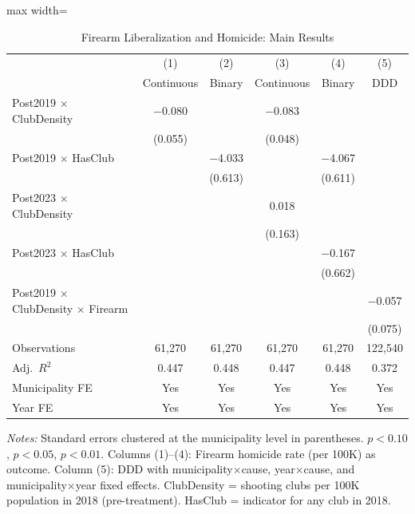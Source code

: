 \begin{table}[t]
\centering
\caption{Firearm Liberalization and Homicide: Main Results}
\label{tab:main_results}
\begin{adjustbox}{max width=\textwidth}
\begin{tabular}{lccccc}
\toprule
 & (1) & (2) & (3) & (4) & (5) \\
 & Continuous & Binary & Continuous & Binary & DDD \\
\midrule
Post2019 $\times$ ClubDensity & $-$0.080 & & $-$0.083\sym{*} & & \\
 & (0.055) & & (0.048) & & \\[3pt]
Post2019 $\times$ HasClub & & $-$4.033\sym{***} & & $-$4.067\sym{***} & \\
 & & (0.613) & & (0.611) & \\[3pt]
Post2023 $\times$ ClubDensity & & & 0.018 & & \\
 & & & (0.163) & & \\[3pt]
Post2023 $\times$ HasClub & & & & $-$0.167 & \\
 & & & & (0.662) & \\[3pt]
Post2019 $\times$ ClubDensity $\times$ Firearm & & & & & $-$0.057 \\
 & & & & & (0.075) \\
\midrule
Observations & 61,270 & 61,270 & 61,270 & 61,270 & 122,540 \\
Adj.\ $R^2$ & 0.447 & 0.448 & 0.447 & 0.448 & 0.372 \\
Municipality FE & Yes & Yes & Yes & Yes & Yes \\
Year FE & Yes & Yes & Yes & Yes & Yes \\
\bottomrule
\end{tabular}
\end{adjustbox}
\begin{flushleft}\small
\textit{Notes:} Standard errors clustered at the municipality level in parentheses. \sym{*} $p<0.10$, \sym{**} $p<0.05$, \sym{***} $p<0.01$. Columns (1)--(4): Firearm homicide rate (per 100K) as outcome. Column (5): DDD with municipality$\times$cause, year$\times$cause, and municipality$\times$year fixed effects. ClubDensity = shooting clubs per 100K population in 2018 (pre-treatment). HasClub = indicator for any club in 2018.
\end{flushleft}
\end{table}
